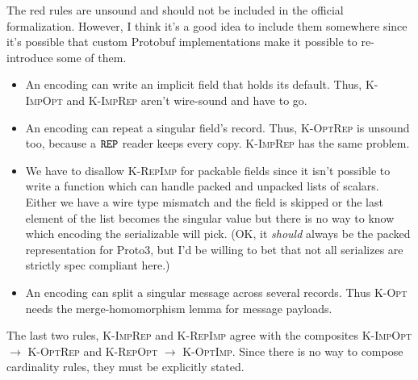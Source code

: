 The red rules are unsound and should not be included in the official
formalization. However, I think it's a good idea to include them somewhere since
it's possible that custom Protobuf implementations make it possible to
re-introduce some of them.
\begin{itemize}
\item An encoding can write an implicit field that holds its default. Thus,
  \textsc{K-ImpOpt} and \textsc{K-ImpRep} aren't wire-sound and have to go.
\item An encoding can repeat a singular field's record. Thus, \textsc{K-OptRep}
  is unsound too, because a $\mathtt{REP}$ reader keeps every copy. \textsc{K-ImpRep}
  has the same problem.
\item We have to disallow \textsc{K-RepImp} for packable fields since it isn't
  possible to write a function which can handle packed and unpacked lists of
  scalars. Either we have a wire type mismatch and the field is skipped or the
  last element of the list becomes the singular value but there is no way to
  know which encoding the serializable will pick. (OK, it \emph{should} always
  be the packed representation for Proto3, but I'd be willing to bet that not
  all serializes are strictly spec compliant here.)
\item An encoding can split a singular message across several records. Thus
  \textsc{K-Opt} needs the merge-homomorphism lemma for message payloads.
\end{itemize}

The last two rules, \textsc{K-ImpRep} and \textsc{K-RepImp} agree with the
composites \textsc{K-ImpOpt} $\rightarrow$ \textsc{K-OptRep} and \textsc{K-RepOpt} $\rightarrow$
\textsc{K-OptImp}. Since there is no way to compose cardinality rules, they must
be explicitly stated.

